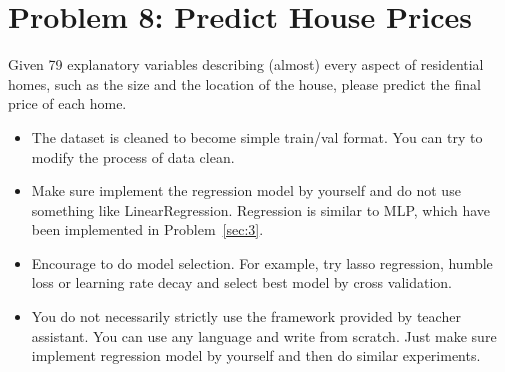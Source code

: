 \documentclass[12pt]{article}
\begin{document}
\section{Problem 8: Predict House Prices} \label{sec:4}
Given 79 explanatory variables describing (almost) every aspect of residential homes, such as the size  and the location of the house, please predict the final price of each home.

\begin{itemize}

	\item The dataset is cleaned to become simple train/val format. You can try to modify the process of data clean.
	\item Make sure implement the regression model by yourself and do not use something like LinearRegression.  Regression is similar to MLP, which have been implemented in  Problem~\ref{sec:3}.

	\item Encourage to do model selection. For example, try lasso regression, humble loss or learning rate decay and select best model by cross validation. 

	\item You do not necessarily strictly use the framework provided by teacher assistant. You can use any language and write from scratch. Just make sure implement regression model by yourself and then do similar experiments. 
\end{itemize}
\end{document}
